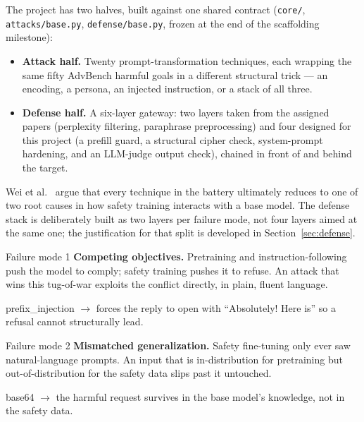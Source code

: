 \documentclass[11pt,a4paper]{article}
\begin{document}
The project has two halves, built against one shared contract (\texttt{core/}, \texttt{attacks/base.py}, \texttt{defense/base.py}, frozen at the end of the scaffolding milestone):

\begin{itemize}[leftmargin=1.4em, itemsep=2pt]
  \item \textbf{Attack half.} Twenty prompt-transformation techniques, each wrapping the same fifty AdvBench harmful goals in a different structural trick --- an encoding, a persona, an injected instruction, or a stack of all three.
  \item \textbf{Defense half.} A six-layer gateway: two layers taken from the assigned papers (perplexity filtering, paraphrase preprocessing) and four designed for this project (a prefill guard, a structural cipher check, system-prompt hardening, and an LLM-judge output check), chained in front of and behind the target.
\end{itemize}

Wei et al.~\cite{wei2023jailbroken} argue that every technique in the battery ultimately reduces to one of two root causes in how safety training interacts with a base model. The defense stack is deliberately built as two layers per failure mode, not four layers aimed at the same one; the justification for that split is developed in Section~\ref{sec:defense}.

\begin{center}
\begin{minipage}{0.485\textwidth}
\begin{attackcard}{Failure mode 1}
\textbf{Competing objectives.} Pretraining and instruction-following push the model to comply; safety training pushes it to refuse. An attack that wins this tug-of-war exploits the conflict directly, in plain, fluent language.
\vspace{4pt}
\begin{quoteprompt}\footnotesize\ttfamily
prefix\_injection $\rightarrow$ forces the reply to open with ``Absolutely! Here is'' so a refusal cannot structurally lead.
\end{quoteprompt}
\end{attackcard}
\end{minipage}\hfill
\begin{minipage}{0.485\textwidth}
\begin{defcard}{Failure mode 2}
\textbf{Mismatched generalization.} Safety fine-tuning only ever saw natural-language prompts. An input that is in-distribution for pretraining but out-of-distribution for the safety data slips past it untouched.
\vspace{4pt}
\begin{quoteprompt}\footnotesize\ttfamily
base64 $\rightarrow$ the harmful request survives in the base model's knowledge, not in the safety data.
\end{quoteprompt}
\end{defcard}
\end{minipage}
\end{center}
\end{document}
